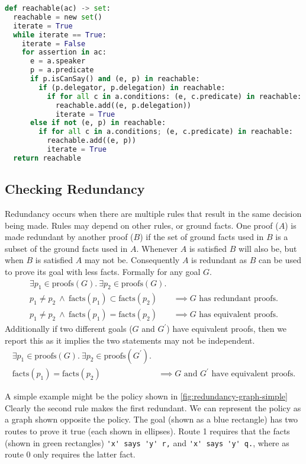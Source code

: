\documentclass[a4paper]{scrartcl}
\begin{document}
\begin{lstlisting}[language=Python,float,caption={Procedure for finding all reachable assertions.},label={alg:reachable}]
def reachable(ac) -> set:
  reachable = new set()
  iterate = True
  while iterate == True:
    iterate = False
    for assertion in ac:
      e = a.speaker
      p = a.predicate
      if p.isCanSay() and (e, p) in reachable:
        if (p.delegator, p.delegation) in reachable:
          if for all c in a.conditions: (e, c.predicate) in reachable:
            reachable.add((e, p.delegation))
            iterate = True
      else if not (e, p) in reachable:
        if for all c in a.conditions; (e, c.predicate) in reachable:
          reachable.add((e, p))
          iterate = True
  return reachable
\end{lstlisting}

\subsection{Checking Redundancy}

Redundancy occurs when there are multiple rules that result in the same decision being
made.  Rules may depend on other rules, or ground facts.  One proof ($A$) is made
redundant by another proof ($B$) if the set of ground facts used in $B$ is a
subset of the ground facts used in $A$. Whenever $A$ is satisfied $B$ will also
be, but when $B$ is satisfied $A$ may not be.  Consequently $A$ is redundant as
$B$ can be used to prove its goal with less facts.
Formally for any goal $G$.
\begin{align*}
  \exists p_1 \in \text{proofs}(G).~\exists p_2 \in \text{proofs}(G).&\\
  p_1 \not= p_2~\wedge~\text{facts}(p_1) \subset \text{facts}(p_2)&\implies G\text{ has redundant proofs.} \\
  p_1 \not= p_2~\wedge~\text{facts}(p_1) = \text{facts}(p_2)&\implies G\text{ has equivalent proofs.}
\end{align*}
Additionally if two different goals ($G$ and $G^\prime$) have equivalent proofs, then we report this
as it implies the two statements may not be independent.
\begin{align*}
  \exists p_1 \in \text{proofs}(G).~\exists p_2 \in \text{proofs}(G^\prime).&\\
  \text{facts}(p_1) = \text{facts}(p_2)&\implies \text{$G$ and $G^\prime$ have equivalent proofs.}
\end{align*}


A simple example might be the policy shown in \autoref{fig:redundancy-graph-simple}
Clearly the second rule makes the first redundant.  We can represent the policy
as a graph shown opposite the policy.  The goal (shown as a blue rectangle) has two routes
to prove it true (each shown in ellipses).  Route 1 requires that the facts
(shown in green rectangles) \lstinline!'x' says 'y' r,! and
\lstinline!'x' says 'y' q.!, where as route 0 only requires the
latter fact.
\end{document}

